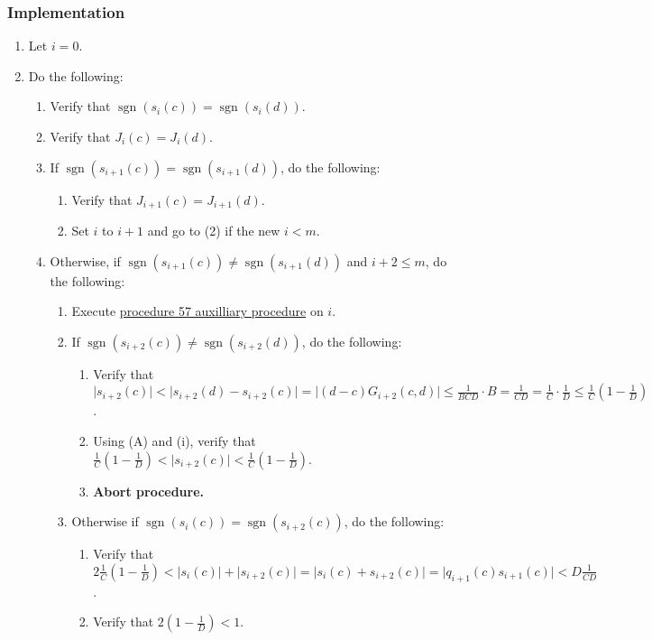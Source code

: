\documentclass[twocolumn]{article}
\DeclareMathOperator{\sgn}{sgn}
\begin{document}
			\subsubsection{Implementation}
				\begin{enumerate}
					\item Let $i=0$.
					\item Do the following:
					\begin{enumerate}
						\item Verify that $\sgn(s_i(c))=\sgn(s_i(d))$.
						\item Verify that $J_i(c)=J_i(d)$.
						\item If $\sgn(s_{i+1}(c))=\sgn(s_{i+1}(d))$, do the following:
						\begin{enumerate}
							\item Verify that $J_{i+1}(c)=J_{i+1}(d)$.
							\item Set $i$ to $i+1$ and go to (2) if the new $i<m$.
						\end{enumerate}
						\item Otherwise, if $\sgn(s_{i+1}(c))\ne\sgn(s_{i+1}(d))$ and $i+2\le m$, do the following:
						\begin{enumerate}
							\item Execute \hyperref[sec:procedure 57 auxilliary procedure]{procedure 57 auxilliary procedure} on $i$.
							\item If $\sgn(s_{i+2}(c))\ne\sgn(s_{i+2}(d))$, do the following:
							\begin{enumerate}
								\item Verify that $\lvert s_{i+2}(c)\rvert<\lvert s_{i+2}(d)-s_{i+2}(c)\rvert=\lvert (d-c)G_{i+2}(c,d)\rvert\le\frac{1}{BCD}\cdot B=\frac{1}{CD}=\frac{1}{C}\cdot\frac{1}{D}\le\frac{1}{C}(1-\frac{1}{D})$.
								\item Using (A) and (i), verify that $\frac{1}{C}(1-\frac{1}{D})<\lvert s_{i+2}(c)\rvert<\frac{1}{C}(1-\frac{1}{D})$.
								\item \textbf{Abort procedure.}
							\end{enumerate}
							\item Otherwise if $\sgn(s_i(c))=\sgn(s_{i+2}(c))$, do the following:
							\begin{enumerate}
								\item Verify that $2\frac{1}{C}(1-\frac{1}{D})<\lvert s_i(c)\rvert+\lvert s_{i+2}(c)\rvert=\lvert s_i(c)+s_{i+2}(c)\rvert=\lvert q_{i+1}(c)s_{i+1}(c)\rvert<D\frac{1}{CD}$.
								\item Verify that $2(1-\frac{1}{D})<1$.

\end{enumerate}
\end{enumerate}
\end{enumerate}
\end{enumerate}
\end{document}
